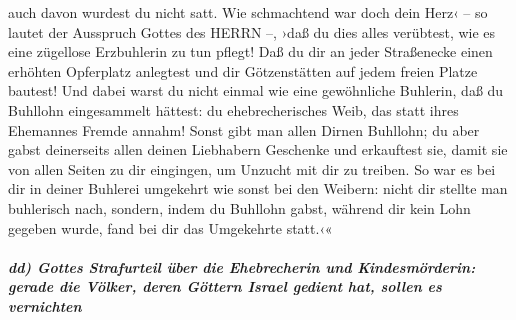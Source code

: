auch davon wurdest du nicht satt. Wie schmachtend war
doch dein Herz‹ -- so lautet der Ausspruch Gottes des HERRN --, ›daß du
dies alles verübtest, wie es eine zügellose Erzbuhlerin zu tun pflegt!
Daß du dir an jeder Straßenecke einen erhöhten Opferplatz
anlegtest und dir Götzenstätten auf jedem freien Platze bautest! Und
dabei warst du nicht einmal wie eine gewöhnliche Buhlerin, daß du
Buhllohn eingesammelt hättest: du ehebrecherisches Weib,
das statt ihres Ehemannes Fremde annahm! Sonst gibt man
allen Dirnen Buhllohn; du aber gabst deinerseits allen deinen Liebhabern
Geschenke und erkauftest sie, damit sie von allen Seiten zu dir
eingingen, um Unzucht mit dir zu treiben. So war es bei
dir in deiner Buhlerei umgekehrt wie sonst bei den Weibern: nicht dir
stellte man buhlerisch nach, sondern, indem du Buhllohn gabst, während
dir kein Lohn gegeben wurde, fand bei dir das Umgekehrte statt.‹«

\hypertarget{dd-gottes-strafurteil-uxfcber-die-ehebrecherin-und-kindesmuxf6rderin-gerade-die-vuxf6lker-deren-guxf6ttern-israel-gedient-hat-sollen-es-vernichten}{%
\subparagraph{dd) Gottes Strafurteil über die Ehebrecherin und
Kindesmörderin: gerade die Völker, deren Göttern Israel gedient hat,
sollen es
vernichten}\label{dd-gottes-strafurteil-uxfcber-die-ehebrecherin-und-kindesmuxf6rderin-gerade-die-vuxf6lker-deren-guxf6ttern-israel-gedient-hat-sollen-es-vernichten}}

